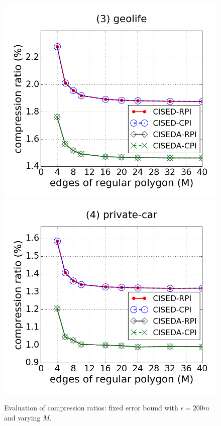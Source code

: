 \begin{figure}[tb!]
\includegraphics[scale = 0.250]{figures/Exp-M-e-200-CR-geolife.png}
\includegraphics[scale = 0.250]{figures/Exp-M-e-200-CR-private.png}
\vspace{-2ex}
\caption{\small Evaluation of compression ratios: fixed error bound with $\epsilon=200m$ and varying $M$.}
\label{fig:m-cr-e200}
\vspace{-1ex}
\end{figure}


